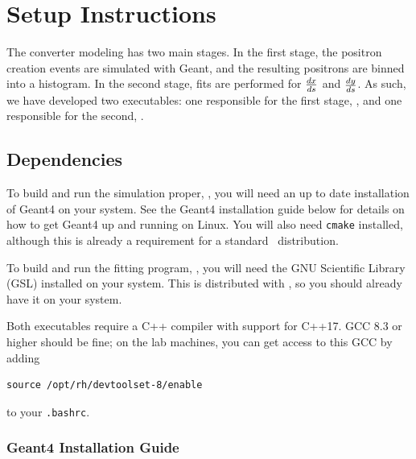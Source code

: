 \documentclass[12pt]{article}
\begin{document}
\section{Setup Instructions}
The converter modeling has two main stages.
In the first stage, the positron creation events are simulated with Geant, and the resulting positrons are binned into a histogram.
In the second stage, fits are performed for $\frac{dx}{ds}$ and $\frac{dy}{ds}$.
As such, we have developed two executables: one responsible for the first stage, \exes, and one responsible for the second, \exef.

\subsection{Dependencies}
To build and run the simulation proper, \exes, you will need an up to date installation of Geant4 on your system.
See the Geant4 installation guide below for details on how to get Geant4 up and running on Linux.
You will also need \texttt{cmake} installed, although this is already a requirement for a standard \bmad \, distribution.

To build and run the fitting program, \exef, you will need the GNU Scientific Library (GSL) installed on your system.
This is distributed with \bmad, so you should already have it on your system.

Both executables require a C++ compiler with support for C++17.
GCC 8.3 or higher should be fine; on the lab machines, you can get access to this GCC by adding
\begin{verbatim}
source /opt/rh/devtoolset-8/enable
\end{verbatim}
to your \texttt{.bashrc}.

\subsubsection{Geant4 Installation Guide}
\end{document}
